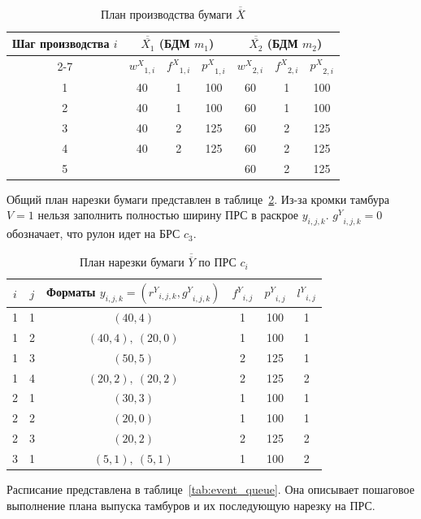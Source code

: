 \begin{table}[htbp]
\centering
\caption{План производства бумаги $\overline{\overline{X}}$}
\label{tab:production_plan}
\begin{tabular}{|c|ccc|ccc|}
\hline
Шаг производства $i$
  & \multicolumn{3}{c|}{$\overline{\overline{X_{1}}}$ (БДМ $m_{1}$)} 
  & \multicolumn{3}{c|}{$\overline{\overline{X_{2}}}$ (БДМ $m_{2}$)} \\
\cline{2-7}
  & ${w^X}_{1,i}$ & ${f^X}_{1,i}$ & ${p^X}_{1,i}$ 
  & ${w^X}_{2,i}$ & ${f^X}_{2,i}$ & ${p^X}_{2,i}$ \\
\hline
1 & 40 & 1 & 100 & 60 & 1 & 100 \\
2 & 40 & 1 & 100 & 60 & 1 & 100 \\
3 & 40 & 2 & 125 & 60 & 2 & 125 \\
4 & 40 & 2 & 125 & 60 & 2 & 125 \\
5 &  &  &  & 60 & 2 & 125 \\
\hline
\end{tabular}
\end{table}

Общий план нарезки бумаги представлен в таблице~\ref{tab:cutting_plan_all}.
Из-за кромки тамбура $V=1$ нельзя заполнить полностью ширину ПРС в раскрое $y_{i, j, k}$.
${g^Y}_{i,j,k}=0$ обозначает, что рулон идет на БРС $c_3$.

\begin{table}[htbp]
\centering
\caption{План нарезки бумаги $\overline{\overline{Y}}$ по ПРС $c_{i}$}
\label{tab:cutting_plan_all}
\begin{tabular}{|c|c|c|c|c|c|}
\hline
$i$ & $j$ & Форматы $y_{i,j,k}=({r^Y}_{i,j,k},{g^Y}_{i,j,k})$ & ${f^Y}_{i,j}$ & ${p^Y}_{i,j}$ & ${l^Y}_{i,j}$ \\
\hline
1 & 1 & $(40,4)$ & 1 & 100 & 1 \\
1 & 2 & $(40,4),\ (20,0)$ & 1 & 100 & 1 \\
1 & 3 & $(50,5)$ & 2 & 125 & 1 \\
1 & 4 & $(20,2),\ (20,2)$ & 2 & 125 & 2 \\
\hline
2 & 1 & $(30,3)$ & 1 & 100 & 1 \\
2 & 2 & $(20,0)$ & 1 & 100 & 1 \\
2 & 3 & $(20,2)$ & 2 & 125 & 2 \\
\hline
3 & 1 & $(5,1),\ (5,1)$ & 1 & 100 & 2 \\
\hline
\end{tabular}
\end{table}

Расписание представлена в таблице~\ref{tab:event_queue}.
Она описывает пошаговое выполнение плана выпуска тамбуров и их последующую нарезку на ПРС.


